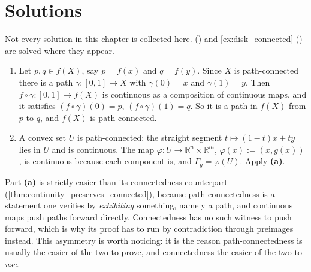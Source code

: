 
\section{Solutions}
\label{sec:connectedness_solutions}

Not every solution in this chapter is collected here. 
() and \cref{ex:disk_connected} () are
solved where they appear.

\begin{exercisesolution}
\label{sol:ai_connected_image}
\begin{enumerate}[label=\textbf{(\alph*)}]
  \item Let $p, q \in f(X)$, say $p = f(x)$ and $q = f(y)$. Since $X$ is path-connected there is
    a path $\gamma : [0,1] \to X$ with $\gamma(0)=x$ and $\gamma(1)=y$. Then
    $f \circ \gamma : [0,1] \to f(X)$ is continuous as a composition of continuous maps, and it
    satisfies $(f\circ\gamma)(0) = p$, $(f\circ\gamma)(1) = q$. So it is a path in $f(X)$ from
    $p$ to $q$, and $f(X)$ is path-connected.
  \item A convex set $U$ is path-connected: the straight segment $t \mapsto (1-t)x + ty$ lies in
    $U$ and is continuous. The map $\varphi : U \to \mathbb{R}^n\times\mathbb{R}^m$,
    $\varphi(x) := (x,g(x))$, is continuous because each component is, and
    $\Gamma_g = \varphi(U)$. Apply \textbf{(a)}.
\end{enumerate}

\begin{remark}
Part \textbf{(a)} is strictly easier than its connectedness counterpart
(\cref{thm:continuity_preserves_connected}), because path-connectedness is a statement one
verifies by \emph{exhibiting} something, namely a path, and continuous maps push paths forward
directly. Connectedness has no such witness to push forward, which is why its proof has to run
by contradiction through preimages instead. This asymmetry is worth noticing: it is the reason
path-connectedness is usually the easier of the two to prove, and connectedness the easier of
the two to \emph{use}.
\end{remark}
\end{exercisesolution}

